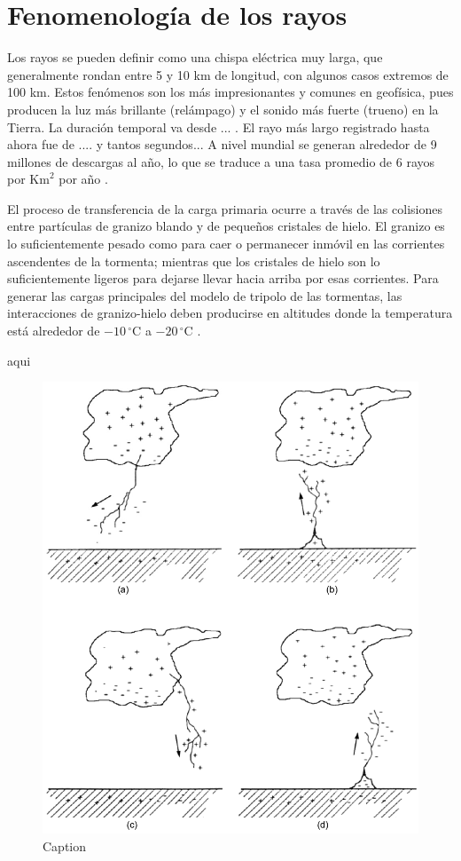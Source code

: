 \documentclass[12pt,oneside,openany,letter]{book}
\begin{document}
\section{Fenomenología de los rayos}\label{fenomenologia}
Los rayos se pueden definir como una chispa eléctrica muy larga, que generalmente rondan entre 5 y 10 km de longitud, con algunos casos extremos de 100 km. Estos fenómenos son los más impresionantes y comunes en geofísica, pues producen la luz más brillante (relámpago) y el sonido más fuerte (trueno) en la Tierra. La duración temporal va desde ... . El rayo más largo registrado hasta ahora fue de .... y tantos segundos... A nivel mundial se generan alrededor de 9 millones de descargas al año, lo que se traduce a una tasa promedio de $6$ rayos por $\text{Km}^{2}$ por año \cite{DwyerUman2014}. 

El proceso de transferencia de la carga primaria ocurre a través de las colisiones entre partículas de granizo blando y de pequeños cristales de hielo. El granizo es lo suficientemente pesado como para caer o permanecer inmóvil en las corrientes ascendentes de la tormenta; mientras que los cristales de hielo son lo suficientemente ligeros para dejarse llevar hacia arriba por esas corrientes. Para generar las cargas principales del modelo de tripolo de las tormentas, las interacciones de granizo-hielo deben producirse en altitudes donde la temperatura está alrededor de $-10\,^{\circ}$C a $-20\,^{\circ}$C \cite{DwyerUman2014}. 

aqui
\begin{figure}
    \centering
    \includegraphics[scale=0.5]{figures/CG4.png}
    \caption{Caption}
    \label{fig:CG4}
\end{figure}
\end{document}
